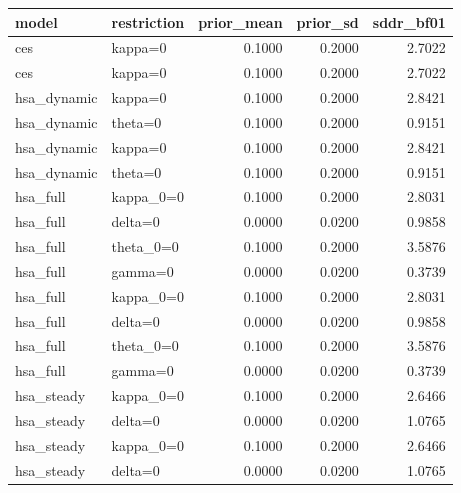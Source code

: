 \begin{tabular}{llrrr}
\toprule
model & restriction & prior\_mean & prior\_sd & sddr\_bf01 \\
\midrule
ces & kappa=0 & 0.1000 & 0.2000 & 2.7022 \\
ces & kappa=0 & 0.1000 & 0.2000 & 2.7022 \\
hsa\_dynamic & kappa=0 & 0.1000 & 0.2000 & 2.8421 \\
hsa\_dynamic & theta=0 & 0.1000 & 0.2000 & 0.9151 \\
hsa\_dynamic & kappa=0 & 0.1000 & 0.2000 & 2.8421 \\
hsa\_dynamic & theta=0 & 0.1000 & 0.2000 & 0.9151 \\
hsa\_full & kappa\_0=0 & 0.1000 & 0.2000 & 2.8031 \\
hsa\_full & delta=0 & 0.0000 & 0.0200 & 0.9858 \\
hsa\_full & theta\_0=0 & 0.1000 & 0.2000 & 3.5876 \\
hsa\_full & gamma=0 & 0.0000 & 0.0200 & 0.3739 \\
hsa\_full & kappa\_0=0 & 0.1000 & 0.2000 & 2.8031 \\
hsa\_full & delta=0 & 0.0000 & 0.0200 & 0.9858 \\
hsa\_full & theta\_0=0 & 0.1000 & 0.2000 & 3.5876 \\
hsa\_full & gamma=0 & 0.0000 & 0.0200 & 0.3739 \\
hsa\_steady & kappa\_0=0 & 0.1000 & 0.2000 & 2.6466 \\
hsa\_steady & delta=0 & 0.0000 & 0.0200 & 1.0765 \\
hsa\_steady & kappa\_0=0 & 0.1000 & 0.2000 & 2.6466 \\
hsa\_steady & delta=0 & 0.0000 & 0.0200 & 1.0765 \\
\bottomrule
\end{tabular}
